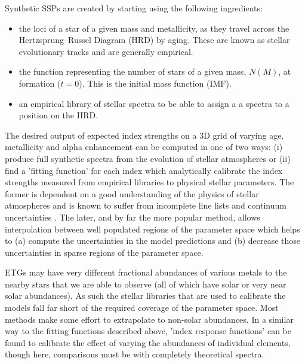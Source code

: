 		Synthetic SSPs are created by starting using the following ingredients:
		\begin{itemize}
			\item the loci of a star of a given mass and metallicity, as they travel across the Hertzsprung--Russel Diagram (HRD) by aging. These are known as stellar evolutionary tracks and are generally empirical.
			\item  the function representing the number of stars of a given mass, $N(M)$, at formation ($t = 0$). This is the initial mass function (IMF).
			\item an empirical library of stellar spectra to be able to assign a a spectra to a position on the HRD. 
		\end{itemize}
		The desired output of expected index strengths on a 3D grid of varying age, metallicity and alpha enhancement can be computed in one of two ways: (i) produce full synthetic spectra from the evolution of stellar atmospheres or (ii) find a 'fitting function' for each index which analytically calibrate the index strengths measured from empirical libraries to physical stellar parameters. The former is dependent on a good understanding of the physics of stellar atmospheres and is known to suffer from incomplete line lists and continuum uncertainties \citep{Thomas2004}. The later, and by far the more popular method, allows interpolation between well populated regions of the parameter space which helps to (a) compute the uncertainties in the model predictions and (b) decrease those uncertainties in sparse regions of the parameter space. 

		ETGs may have very different fractional abundances of various metals to the nearby stars that we are able to observe (all of which have solar or very near solar abundances). As such the stellar libraries that are used to calibrate the models fall far short of the required coverage of the parameter space. Most methods make some effort to extrapolate to non-solar abundances. In a similar way to the fitting functions described above, 'index response functions' can be found to calibrate the effect of varying the abundances of individual elements, though here, comparisons must be with completely theoretical spectra.


